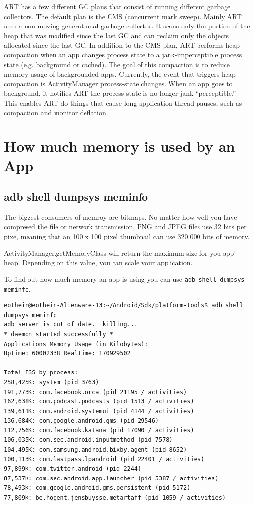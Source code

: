 ART has a few different GC plans that consist of running different garbage collectors. The default plan is the CMS (concurrent mark sweep). Mainly ART uses a  non-moving generational garbage collector. It scans only the portion of the heap that was modified since the last GC and can reclaim only the objects allocated since the last GC. In addition to the CMS plan, ART performs heap compaction when an app changes process state to a jank-imperceptible process state (e.g. background or cached). The goal of this compaction is to reduce memory usage of backgrounded apps. Currently, the event that triggers heap compaction is ActivityManager process-state changes. When an app goes to background, it notifies ART the process state is no longer jank “perceptible.” This enables ART do things that cause long application thread pauses, such as compaction and monitor deflation. 

\section{How much memory is used by an App}
\subsection{adb shell dumpsys meminfo}
The biggest consumers of memroy are bitmaps. No matter how well you have compresed the file or network transmission, PNG and JPEG files use 32 bits per pixe, meaning that an 100 x 100 pixel thumbnail can use 320.000 bits of memory.

ActivityManager.getMemoryClass will return the maximum size for you app' heap. Depending on this value, you can scale your application. 

To find out how much memory an app is using you can use \texttt{adb shell dumpsys meminfo}. 

\begin{verbatim}
eothein@eothein-Alienware-13:~/Android/Sdk/platform-tools$ adb shell dumpsys meminfo
adb server is out of date.  killing...
* daemon started successfully *
Applications Memory Usage (in Kilobytes):
Uptime: 60002338 Realtime: 170929502

Total PSS by process:
258,425K: system (pid 3763)
191,773K: com.facebook.orca (pid 21195 / activities)
162,638K: com.podcast.podcasts (pid 1513 / activities)
139,611K: com.android.systemui (pid 4144 / activities)
136,684K: com.google.android.gms (pid 29546)
112,756K: com.facebook.katana (pid 17090 / activities)
106,035K: com.sec.android.inputmethod (pid 7578)
104,495K: com.samsung.android.bixby.agent (pid 8652)
100,113K: com.lastpass.lpandroid (pid 22401 / activities)
97,899K: com.twitter.android (pid 2244)
87,537K: com.sec.android.app.launcher (pid 5387 / activities)
78,493K: com.google.android.gms.persistent (pid 5172)
77,809K: be.hogent.jensbuysse.metartaff (pid 1059 / activities)

\end{verbatim}


